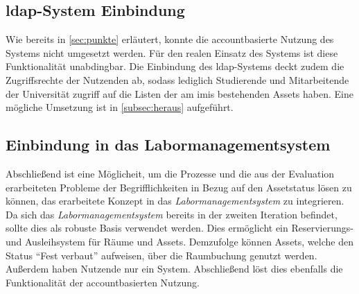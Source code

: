 \subsection{\ac{ldap}-System Einbindung} Wie bereits in \ref{sec:punkte}
erläutert, konnte die accountbasierte Nutzung des Systems nicht umgesetzt
werden. Für den realen Einsatz des Systems ist diese Funktionalität unabdingbar.
Die Einbindung des  \ac{ldap}-Systems deckt zudem die Zugriffsrechte der
Nutzenden ab, sodass lediglich Studierende und Mitarbeitende der Universität
zugriff auf die Listen der am \ac{imis} bestehenden Assets haben. Eine
mögliche Umsetzung ist in \ref{subsec:heraus} aufgeführt.

\subsection{Einbindung in das Labormanagementsystem}
Abschließend ist eine Möglicheit, um die Prozesse und die aus der Evaluation erarbeiteten Probleme
der Begrifflichkeiten in Bezug auf den Assetstatus lösen zu können, das erarbeitete Konzept in das
\textit{Labormanagementsystem} \cite{Pabst2022} zu integrieren. Da sich das
\textit{Labormanagementsystem} bereits in der zweiten Iteration befindet, sollte dies als robuste
Basis verwendet werden. Dies ermöglicht ein Reservierungs- und Ausleihsystem für Räume und Assets.
Demzufolge können Assets, welche den Status \enquote{Fest verbaut} aufweisen, über die Raumbuchung
genutzt werden. Außerdem haben Nutzende nur ein System. Abschließend löst dies ebenfalls die
Funktionalität der accountbasierten Nutzung.


